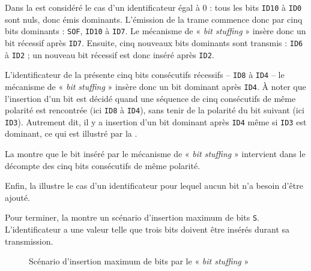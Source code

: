 Dans la  est considéré le cas d'un identificateur égal à $0$ : tous les bits \texttt{ID10} à \texttt{ID0} sont nuls, donc émis dominants. L'émission de la trame commence donc par cinq bits dominants : \texttt{SOF}, \texttt{ID10} à \texttt{ID7}. Le mécanisme de « \emph{bit stuffing} » insère donc un bit récessif après \texttt{ID7}. Ensuite, cinq nouveaux bits dominants sont transmis : \texttt{ID6} à \texttt{ID2} ; un nouveau bit récessif est donc inséré après \texttt{ID2}.

L'identificateur de la  présente cinq bits consécutifs récessifs -- \texttt{ID8} à \texttt{ID4} -- le mécanisme de « \emph{bit stuffing} » insère donc un bit dominant après \texttt{ID4}. À noter que l'insertion d'un bit est décidé quand une séquence de cinq consécutifs de même polarité est rencontrée (ici \texttt{ID8} à \texttt{ID4}), sans tenir de la polarité du bit suivant (ici \texttt{ID3}). Autrement dit, il y a insertion d'un bit dominant après \texttt{ID4} même si \texttt{ID3} est dominant, ce qui est illustré par la .

La  montre que le bit inséré par le mécanisme de « \emph{bit stuffing} » intervient dans le décompte des cinq bits consécutifs de même polarité. 


Enfin, la  illustre le cas d'un identificateur pour lequel aucun bit n'a besoin d'être ajouté.

Pour terminer, la  montre un scénario d'insertion maximum de bits \texttt{S}. L'identificateur a une valeur telle que trois bits doivent être insérés durant sa transmission.

\begin{figure}[h]
  \centering
  \caption{Scénario d'insertion maximum de bits par le « \emph{bit stuffing} »}
\end{figure}




